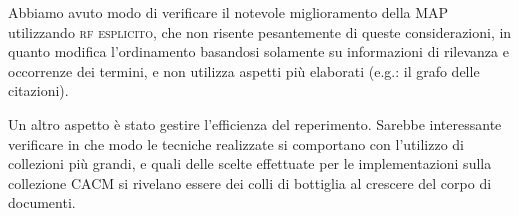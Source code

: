 \documentclass{llncs}
\begin{document}
Abbiamo avuto modo di verificare il notevole miglioramento della MAP utilizzando \textsc{rf esplicito}, che non risente pesantemente di queste considerazioni, in quanto modifica l'ordinamento basandosi solamente su informazioni di rilevanza e occorrenze dei termini, e non utilizza aspetti pi\`u elaborati (e.g.: il grafo delle citazioni).

Un altro aspetto \`e stato gestire l'efficienza del reperimento. Sarebbe interessante verificare in che modo le tecniche realizzate si comportano con l'utilizzo di collezioni pi\`u grandi, e quali delle scelte effettuate per le implementazioni sulla collezione CACM si rivelano essere dei colli di bottiglia al crescere del corpo di documenti.




\end{document}
